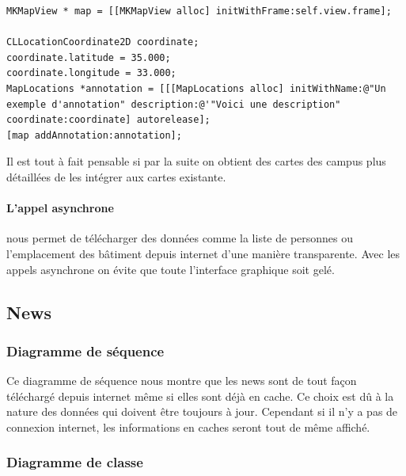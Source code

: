 			\lstset{
			    style = Xcode,
			    caption=Code de création d'un objet MKMapView et l'ajout d'une annotation.,
			    breaklines=true,
			    frame=single
			}

\begin{lstlisting}[name=MapView with label  , label=MKMapView]
MKMapView * map = [[MKMapView alloc] initWithFrame:self.view.frame];

CLLocationCoordinate2D coordinate;
coordinate.latitude = 35.000;
coordinate.longitude = 33.000;            
MapLocations *annotation = [[[MapLocations alloc] initWithName:@"Un exemple d'annotation" description:@'"Voici une description" coordinate:coordinate] autorelease];
[map addAnnotation:annotation];
\end{lstlisting}
		Il est tout à fait pensable si par la suite on obtient des cartes des campus plus détaillées de les intégrer aux cartes existante. 
		
		\paragraph{L'appel asynchrone} nous permet de télécharger des données comme la liste de personnes ou l'emplacement des bâtiment depuis internet d'une manière transparente. Avec les appels asynchrone on évite que toute l'interface graphique soit gelé.


	\subsection{News}
			\subsubsection*{Diagramme de séquence}
				Ce diagramme de séquence nous montre que les news sont de tout façon téléchargé depuis internet même si elles sont déjà en cache. Ce choix est dû à la nature des données qui doivent être toujours à jour. Cependant si il n'y a pas de connexion internet, les informations en caches seront tout de même affiché. 
			\subsubsection*{Diagramme de classe}
